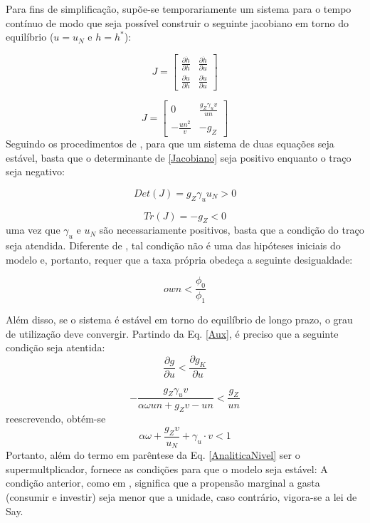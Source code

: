 Para fins de simplificação, supõe-se temporariamente um sistema para o tempo contínuo de modo que seja possível construir o seguinte jacobiano em torno do equilíbrio ($u = u_N$ e $h = h^*$):

$$
J = 
\left[\begin{matrix}
\frac{\partial \dot h}{\partial h} & \frac{\partial \dot h}{\partial u}\\
\frac{\partial \dot u}{\partial h} & \frac{\partial \dot u}{\partial u}
\end{matrix}\right]
$$

\begin{equation}
J = 
\label{Jacobiano}
\left[\begin{matrix}0 & \frac{g_Z \gamma_{u} v}{un}\\- \frac{un^{2}}{v} & - g_Z\end{matrix}\right]
\end{equation}
Seguindo os procedimentos de \textcite{gandolfo_economic_2010}, para que um sistema de duas equações seja estável, basta que o determinante de \ref{Jacobiano} seja positivo enquanto o traço seja negativo:

$$
Det(J) = g_Z \gamma_{u} u_N > 0
$$

$$
Tr(J) = -g_Z < 0
$$
uma vez que $\gamma_u$ e $u_N$ são necessariamente positivos, basta que a condição do traço seja atendida. Diferente de \textcite{freitas_growth_2015}, tal condição não é uma das hipóteses iniciais do modelo e, portanto, requer que a taxa própria obedeça a seguinte desigualdade:

\begin{equation}
own < \frac{\phi_0}{\phi_1}
\end{equation}

Além disso, se o sistema é estável em torno do equilíbrio de longo prazo, o grau de utilização deve convergir. Partindo da Eq. \ref{Aux}, é preciso que a seguinte condição seja atentida:
$$
\frac{\partial g}{\partial u} < \frac{\partial g_K}{\partial u}
$$

$$
- \frac{g_Z \gamma_{u} v}{\alpha \omega un + g_Z v - un} < \frac{g_Z}{un}
$$
reescrevendo, obtém-se
\begin{equation}
\alpha \omega + \frac{g_Z v}{u_N} + \gamma_u\cdot v < 1
\end{equation}
Portanto, além do termo em parêntese da Eq. \ref{AnaliticaNivel} ser o supermultplicador, fornece as condições para que o modelo seja estável: 
A condição anterior, como em \textcite{freitas_growth_2015}, significa que a propensão marginal a gasta (consumir e investir) seja menor que a unidade, caso contrário, vigora-se a lei de Say.



